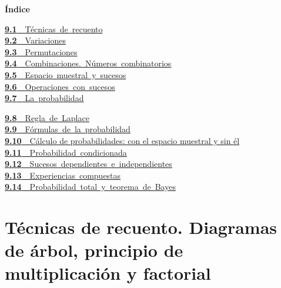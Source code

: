 \documentclass[11pt,a4paper]{article}
\begin{document}
\begin{tcolorbox}[colback=fmsurface,colframe=fmsurface,arc=3mm,left=4mm,right=4mm,top=2mm,bottom=2mm]
\small\textbf{Índice}\par\smallskip
\begin{minipage}[t]{0.49\linewidth}\small \mbox{\hyperlink{sec1}{\textbf{\color{fmgreen}9.1}\ \ Técnicas de recuento}}\\[3pt]
\mbox{\hyperlink{sec2}{\textbf{\color{fmgreen}9.2}\ \ Variaciones}}\\[3pt]
\mbox{\hyperlink{sec3}{\textbf{\color{fmgreen}9.3}\ \ Permutaciones}}\\[3pt]
\mbox{\hyperlink{sec4}{\textbf{\color{fmgreen}9.4}\ \ Combinaciones. Números combinatorios}}\\[3pt]
\mbox{\hyperlink{sec5}{\textbf{\color{fmgreen}9.5}\ \ Espacio muestral y sucesos}}\\[3pt]
\mbox{\hyperlink{sec6}{\textbf{\color{fmgreen}9.6}\ \ Operaciones con sucesos}}\\[3pt]
\mbox{\hyperlink{sec7}{\textbf{\color{fmgreen}9.7}\ \ La probabilidad}}\\[3pt]\end{minipage}\hfill\begin{minipage}[t]{0.49\linewidth}\small \mbox{\hyperlink{sec8}{\textbf{\color{fmgreen}9.8}\ \ Regla de Laplace}}\\[3pt]
\mbox{\hyperlink{sec9}{\textbf{\color{fmgreen}9.9}\ \ Fórmulas de la probabilidad}}\\[3pt]
\hyperlink{sec10}{\textbf{\color{fmgreen}9.10}\ \ Cálculo de probabilidades: con el espacio muestral y sin él}\\[3pt]
\mbox{\hyperlink{sec11}{\textbf{\color{fmgreen}9.11}\ \ Probabilidad condicionada}}\\[3pt]
\mbox{\hyperlink{sec12}{\textbf{\color{fmgreen}9.12}\ \ Sucesos dependientes e independientes}}\\[3pt]
\mbox{\hyperlink{sec13}{\textbf{\color{fmgreen}9.13}\ \ Experiencias compuestas}}\\[3pt]
\mbox{\hyperlink{sec14}{\textbf{\color{fmgreen}9.14}\ \ Probabilidad total y teorema de Bayes}}\\[3pt]\end{minipage}
\end{tcolorbox}

\Needspace{6.2cm}
\section{Técnicas de recuento. Diagramas de árbol, principio de multiplicación y factorial}\hypertarget{sec1}{}
\end{document}

